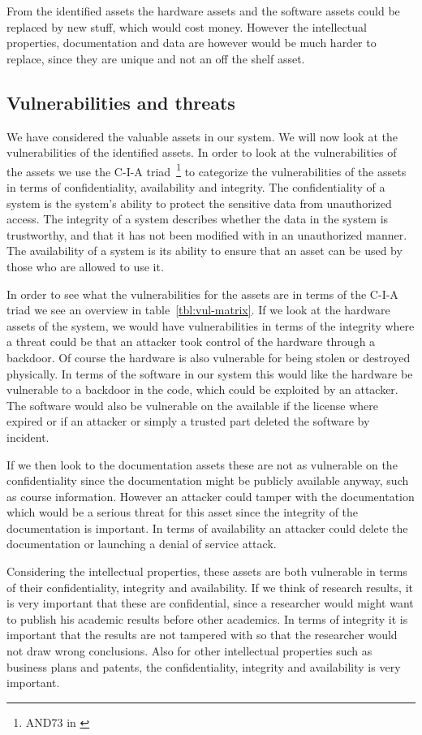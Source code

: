 From the identified assets the hardware assets and the software assets could be replaced by new stuff, which would cost money. However the intellectual properties, documentation and data are however would be much harder to replace, since they are unique and not an off the shelf asset.

\subsection{Vulnerabilities and threats}
We have considered the valuable assets in our system. We will now look at the vulnerabilities of the identified assets. In order to look at the vulnerabilities of the assets we use the C-I-A triad~\footnote{AND73 in \cite{pfleeger}} to categorize the vulnerabilities of the assets in terms of confidentiality, availability and integrity. The confidentiality of a system is the system’s ability to protect the sensitive data from unauthorized access. The integrity of a system describes whether the data in the system is trustworthy, and that it has not been modified with in an unauthorized manner. The availability of a system is its ability to ensure that an asset can be used by those who are allowed to use it.

In order to see what the vulnerabilities for the assets are in terms of the C-I-A triad we see an overview in table~\ref{tbl:vul-matrix}. If we look at the hardware assets of the system, we would have vulnerabilities in terms of the integrity where a threat could be that an attacker took control of the hardware through a backdoor. Of course the hardware is also vulnerable for being stolen or destroyed physically. In terms of the software in our system this would like the hardware be vulnerable to a backdoor in the code, which could be exploited by an attacker. The software would also be vulnerable on the available if the license where expired or if an attacker or simply a trusted part deleted the software by incident.

If we then look to the documentation assets these are not as vulnerable on the confidentiality since the documentation might be publicly available anyway, such as course information. However an attacker could tamper with the documentation which would be a serious threat for this asset since the integrity of the documentation is important. In terms of availability an attacker could delete the documentation or launching a denial of service attack.

Considering the intellectual properties, these assets are both vulnerable in terms of their confidentiality, integrity and availability. If we think of research results, it is very important that these are confidential, since a researcher would might want to publish his academic results before other academics. In terms of integrity it is important that the results are not tampered with so that the researcher would not draw wrong conclusions. Also for other intellectual properties such as business plans and patents, the confidentiality, integrity and availability is very important.


